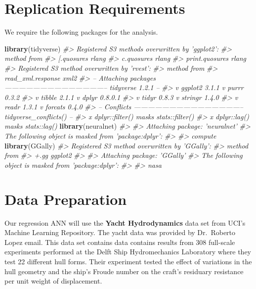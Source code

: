 \documentclass[]{book}
\newenvironment{Shaded}{\begin{snugshade}}{\end{snugshade}}
\newcommand{\CommentTok}[1]{\textcolor[rgb]{0.56,0.35,0.01}{\textit{#1}}}
\newcommand{\KeywordTok}[1]{\textcolor[rgb]{0.13,0.29,0.53}{\textbf{#1}}}
\newcommand{\NormalTok}[1]{#1}
\begin{document}
\hypertarget{replication-requirements}{%
\section{Replication Requirements}\label{replication-requirements}}

We require the following packages for the analysis.

\begin{Shaded}
\begin{Highlighting}[]
\KeywordTok{library}\NormalTok{(tidyverse)}
\CommentTok{#> Registered S3 methods overwritten by 'ggplot2':}
\CommentTok{#>   method         from }
\CommentTok{#>   [.quosures     rlang}
\CommentTok{#>   c.quosures     rlang}
\CommentTok{#>   print.quosures rlang}
\CommentTok{#> Registered S3 method overwritten by 'rvest':}
\CommentTok{#>   method            from}
\CommentTok{#>   read_xml.response xml2}
\CommentTok{#> -- Attaching packages -------------------------------------------- tidyverse 1.2.1 --}
\CommentTok{#> v ggplot2 3.1.1       v purrr   0.3.2  }
\CommentTok{#> v tibble  2.1.1       v dplyr   0.8.0.1}
\CommentTok{#> v tidyr   0.8.3       v stringr 1.4.0  }
\CommentTok{#> v readr   1.3.1       v forcats 0.4.0}
\CommentTok{#> -- Conflicts ----------------------------------------------- tidyverse_conflicts() --}
\CommentTok{#> x dplyr::filter() masks stats::filter()}
\CommentTok{#> x dplyr::lag()    masks stats::lag()}
\KeywordTok{library}\NormalTok{(neuralnet)}
\CommentTok{#> }
\CommentTok{#> Attaching package: 'neuralnet'}
\CommentTok{#> The following object is masked from 'package:dplyr':}
\CommentTok{#> }
\CommentTok{#>     compute}
\KeywordTok{library}\NormalTok{(GGally)}
\CommentTok{#> Registered S3 method overwritten by 'GGally':}
\CommentTok{#>   method from   }
\CommentTok{#>   +.gg   ggplot2}
\CommentTok{#> }
\CommentTok{#> Attaching package: 'GGally'}
\CommentTok{#> The following object is masked from 'package:dplyr':}
\CommentTok{#> }
\CommentTok{#>     nasa}
\end{Highlighting}
\end{Shaded}

\hypertarget{data-preparation}{%
\section{Data Preparation}\label{data-preparation}}

Our regression ANN will use the \textbf{Yacht Hydrodynamics} data set from UCI's Machine Learning Repository. The yacht data was provided by Dr.~Roberto Lopez email. This data set contains data contains results from 308 full-scale experiments performed at the Delft Ship Hydromechanics Laboratory where they test 22 different hull forms. Their experiment tested the effect of variations in the hull geometry and the ship's Froude number on the craft's residuary resistance per unit weight of displacement.
\end{document}
